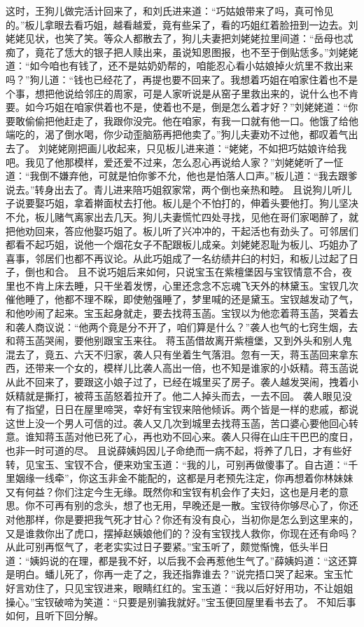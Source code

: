 \documentclass[12pt,oneside]{book}
\begin{document}
这时，王狗儿做完活计回来了，和刘氏进来道：“巧姑娘带来了吗，真可怜见的。”板儿拿眼去看巧姐，越看越爱，竟有些呆了，看的巧姐红着脸扭到一边去。刘姥姥见状，也笑了笑。等众人都散去了，狗儿夫妻把刘姥姥拉里间道：“岳母也忒痴了，竟花了恁大的银子把人赎出来，虽说知恩图报，也不至于倒贴恁多。”刘姥姥道：“如今咱也有钱了，还不是姑奶奶帮的，咱能忍心看小姑娘掉火炕里不救出来吗？”狗儿道：“钱也已经花了，再提也要不回来了。我想着巧姐在咱家住着也不是个事，想把他说给邻庄的周家，可是人家听说是从窑子里救出来的，说什么也不肯要。如今巧姐在咱家供着也不是，使着也不是，倒是怎么着才好？”刘姥姥道：“你要敢偷偷把他赶走了，我跟你没完。他在咱家，有我一口就有他一口。他饿了给他端吃的，渴了倒水喝，你少动歪脑筋再把他卖了。”狗儿夫妻劝不过他，都叹着气出去了。
刘姥姥刚把画儿收起来，只见板儿进来道：“姥姥，不如把巧姑娘许给我吧。我见了他那模样，爱还爱不过来，怎么忍心再说给人家？”刘姥姥听了一怔道：“我倒不嫌弃他，可就是怕你爹不允，他也是怕落人口声。”板儿道：“我去跟爹说去。”转身出去了。青儿进来陪巧姐叙家常，两个倒也亲热和睦。
且说狗儿听儿子说要娶巧姐，拿着擀面杖去打他。板儿是个不怕打的，伸着头要他打。狗儿坚决不允，板儿赌气离家出去几天。狗儿夫妻慌忙四处寻找，见他在哥们家喝醉了，就把他劝回来，答应他娶巧姐了。板儿听了兴冲冲的，干起活也有劲头了。可邻居们都看不起巧姐，说他一个烟花女子不配跟板儿成亲。刘姥姥忍耻为板儿、巧姐办了喜事，邻居们也都不再议论。从此巧姐成了一名纺绩井臼的村妇，和板儿过起了日子，倒也和合。
且不说巧姐后来如何，只说宝玉在紫檀堡因与宝钗情意不合，夜里也不肯上床去睡，只干坐着发愣，心里还念念不忘魂飞天外的林黛玉。宝钗几次催他睡了，他都不理不睬，即使勉强睡了，梦里喊的还是黛玉。宝钗越发动了气，和他吵闹了起来。宝玉起身就走，要去找蒋玉菡。宝钗以为他恋着蒋玉菡，哭着去和袭人商议说：“他两个竟是分不开了，咱们算是什么？”袭人也气的七窍生烟，去和蒋玉菡哭闹，要他别跟宝玉来往。
蒋玉菡借故离开紫檀堡，又到外头和别人鬼混去了，竟五、六天不归家，袭人只有坐着生气落泪。忽有一天，蒋玉菡回来拿东西，还带来一个女的，模样儿比袭人高出一倍，也不知是谁家的小妖精。蒋玉菡说从此不回来了，要跟这小娘子过了，已经在城里买了房子。袭人越发哭闹，拽着小妖精就是撕打，被蒋玉菡怒着拉开了。他二人掉头而去，一去不回。
袭人眼见没有了指望，日日在屋里啼哭，幸好有宝钗来陪他倾诉。两个皆是一样的悲戚，都说这世上没一个男人可信的过。袭人又几次到城里去找蒋玉菡，苦口婆心要他回心转意。谁知蒋玉菡对他已死了心，再也劝不回心来。袭人只得在山庄干巴巴的度日，也非一时可道的尽。
且说薛姨妈因儿子命绝而一病不起，将养了几日，才有些好转，见宝玉、宝钗不合，便来劝宝玉道：“我的儿，可别再做傻事了。自古道：“千里姻缘一线牵”，你这玉非金不能配的，这都是月老预先注定，你再想着你林妹妹又有何益？你们注定今生无缘。既然你和宝钗有机会作了夫妇，这也是月老的意思。你不可再有别的念头，想了也无用，早晚还是一散。宝钗待你够尽心了，你还对他那样，你是要把我气死才甘心？你还有没有良心，当初你是怎么到这里来的，又是谁救你出了虎口，摆掉赵姨娘他们的？没有宝钗找人救你，你现在还有命吗？从此可别再怄气了，老老实实过日子要紧。”宝玉听了，颇觉惭愧，低头半日道：“姨妈说的在理，都是我不好，以后我不会再惹他生气了。”薛姨妈道：“这还算是明白。蟠儿死了，你再一走了之，我还指靠谁去？”说完捂口哭了起来。宝玉忙好言劝住了，只见宝钗进来，眼睛红红的。宝玉道：“我以后好好用功，不让姐姐操心。”宝钗破啼为笑道：“只要是别骗我就好。”宝玉便回屋里看书去了。
不知后事如何，且听下回分解。
\end{document}
